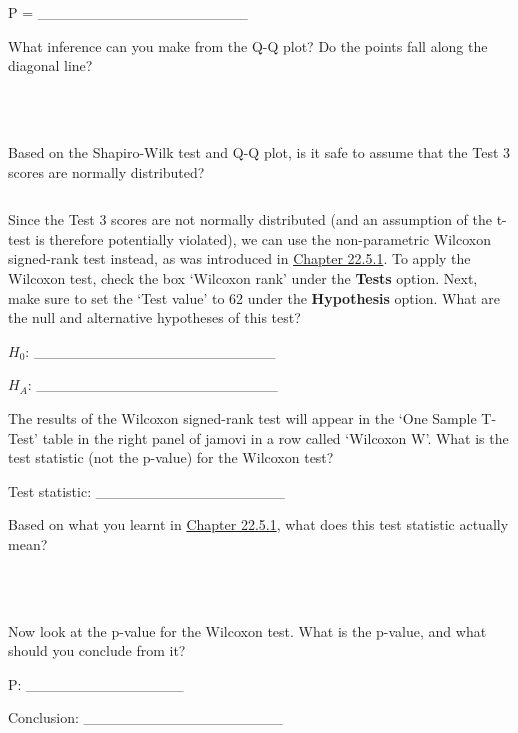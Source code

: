 \documentclass[
  openany]{krantz}
\begin{document}
P = \_\_\_\_\_\_\_\_\_\_\_\_\_\_\_\_\_\_\_\_

What inference can you make from the Q-Q plot?
Do the points fall along the diagonal line?

\begin{verbatim}



\end{verbatim}

Based on the Shapiro-Wilk test and Q-Q plot, is it safe to assume that the Test 3 scores are normally distributed?

\begin{verbatim}

\end{verbatim}

Since the Test 3 scores are not normally distributed (and an assumption of the t-test is therefore potentially violated), we can use the non-parametric Wilcoxon signed-rank test instead, as was introduced in \protect\hyperlink{wilcoxon-test}{Chapter 22.5.1}.
To apply the Wilcoxon test, check the box `Wilcoxon rank' under the \textbf{Tests} option.
Next, make sure to set the `Test value' to 62 under the \textbf{Hypothesis} option.
What are the null and alternative hypotheses of this test?

\(H_{0}\): \_\_\_\_\_\_\_\_\_\_\_\_\_\_\_\_\_\_\_\_\_\_\_

\(H_{A}\): \_\_\_\_\_\_\_\_\_\_\_\_\_\_\_\_\_\_\_\_\_\_\_

The results of the Wilcoxon signed-rank test will appear in the `One Sample T-Test' table in the right panel of jamovi in a row called `Wilcoxon W'.
What is the test statistic (not the p-value) for the Wilcoxon test?

Test statistic: \_\_\_\_\_\_\_\_\_\_\_\_\_\_\_\_\_\_

Based on what you learnt in \protect\hyperlink{wilcoxon-test}{Chapter 22.5.1}, what does this test statistic actually mean?

\begin{verbatim}



\end{verbatim}

Now look at the p-value for the Wilcoxon test.
What is the p-value, and what should you conclude from it?

P: \_\_\_\_\_\_\_\_\_\_\_\_\_\_\_

Conclusion: \_\_\_\_\_\_\_\_\_\_\_\_\_\_\_\_\_\_\_
\end{document}
